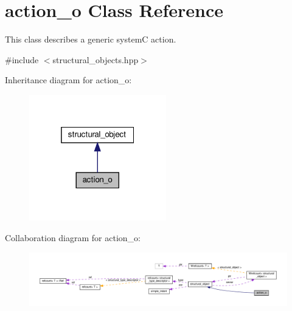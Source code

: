 \hypertarget{classaction__o}{}\section{action\+\_\+o Class Reference}
\label{classaction__o}


This class describes a generic systemC action.  




{\ttfamily \#include $<$structural\+\_\+objects.\+hpp$>$}



Inheritance diagram for action\+\_\+o\+:
\nopagebreak
\begin{figure}[H]
\begin{center}
\leavevmode
\includegraphics[width=169pt]{dc/dca/classaction__o__inherit__graph}
\end{center}
\end{figure}


Collaboration diagram for action\+\_\+o\+:
\nopagebreak
\begin{figure}[H]
\begin{center}
\leavevmode
\includegraphics[width=350pt]{dd/d5e/classaction__o__coll__graph}
\end{center}
\end{figure}
